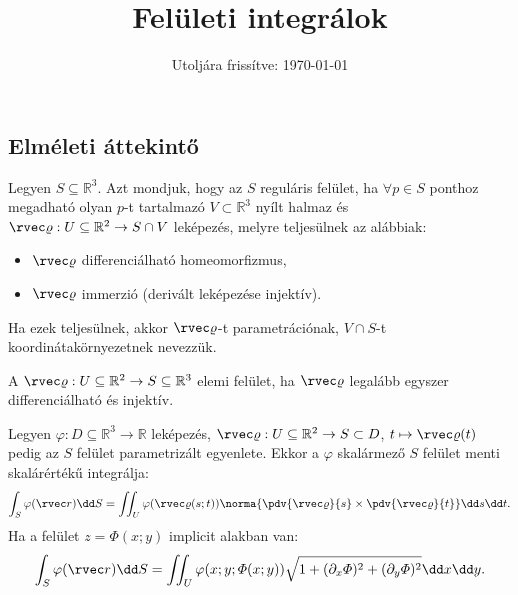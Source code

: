 \documentclass[a4paper, 12pt]{scrartcl}
\title{Felületi integrálok}
\date{Utoljára frissítve: \today}
\begin{document}
\allowdisplaybreaks

\maketitle

\vspace{-1em}

\subsection{Elméleti áttekintő}

\begin{definition}
  Legyen $S \subseteq \mathbb R^3$. Azt mondjuk, hogy az $S$ reguláris felület,
  ha $\forall p \in S$ ponthoz megadható olyan $p$-t tartalmazó $V \subset
    \mathbb R^3$ nyílt halmaz és $\rvec \varrho : U \subseteq \mathbb R^2
    \rightarrow S \cap V$ leképezés, melyre teljesülnek az alábbiak:
  \begin{itemize}
    \item $\rvec \varrho$ differenciálható homeomorfizmus,

    \item $\rvec \varrho$ immerzió (derivált leképezése injektív).
  \end{itemize}
  Ha ezek teljesülnek, akkor $\rvec \varrho$-t parametrációnak,
  $V \cap S$-t  koordinátakörnyezetnek nevezzük.
\end{definition}

\vfill

\begin{definition}
  A $\rvec \varrho: U \subseteq \mathbb R^2 \rightarrow S \subseteq \mathbb R^3$
  elemi felület, ha $\rvec \varrho$ legalább egyszer differenciálható és
  injektív.
\end{definition}

\vfill

\begin{definition}
  Legyen $\varphi: D \subseteq \mathbb R^3 \rightarrow \mathbb R$ leképezés,
  $\rvec \varrho: U \subseteq \mathbb R^2 \rightarrow S \subset D$, $t \mapsto
    \rvec \varrho(t)$ pedig az $S$ felület parametrizált egyenlete. Ekkor a
  $\varphi$ skalármező $S$ felület menti skalárértékű integrálja:
  \[
    \int_S \varphi (\rvec r) \dd S =
    \iint_U \varphi (\rvec \varrho(s; t))
    \norma{\pdv{\rvec \varrho}{s} \times \pdv{\rvec \varrho}{t}}
    \dd s \dd t
    \text.
  \]
  Ha a felület $z = \varPhi(x; y)$ implicit alakban van:
  \[
    \int_S \varphi (\rvec r) \dd S =
    \iint_U \varphi (x; y; \varPhi(x;y))
    \sqrt{1 + (\partial_x \varPhi)^2 + (\partial_y \varPhi)^2}
    \dd x \dd y
    \text.
  \]
\end{definition}
\end{document}
